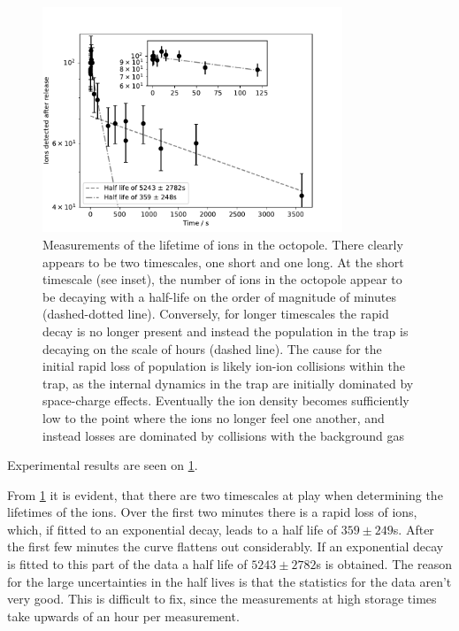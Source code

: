 \begin{figure}[h]
    \centering
    \includegraphics[width = 0.8\textwidth]{main/DecayTimes.pdf}
    \caption{Measurements of the lifetime of ions in the octopole. There clearly appears to be two timescales, one short and one long. At the short timescale (see inset), the number of ions in the octopole appear to be decaying with a half-life on the order of magnitude of minutes (dashed-dotted line). Conversely, for longer timescales the rapid decay is no longer present and instead the population in the trap is decaying on the scale of hours (dashed line).
    The cause for the initial rapid loss of population is likely ion-ion collisions within the trap, as the internal dynamics in the trap are initially dominated by space-charge effects. Eventually the ion density becomes sufficiently low to the point where the ions no longer feel one another, and instead losses are dominated by collisions with the background gas}
    \label{fig:decayResults}
\end{figure}
Experimental results are seen on \cref{fig:decayResults}.

From \cref{fig:decayResults} it is evident, that there are two timescales at play when determining the lifetimes of the ions.
Over the first two minutes there is a rapid loss of ions, which, if fitted to an exponential decay, leads to a half life of $359\pm249$s. After the first few minutes the curve flattens out considerably. If an exponential decay is fitted to this part of the data a half life of $5243\pm2782$s is obtained. The reason for the large uncertainties in the half lives is that the statistics for the data aren't very good. This is difficult to fix, since the measurements at high storage times take upwards of an hour per measurement.

